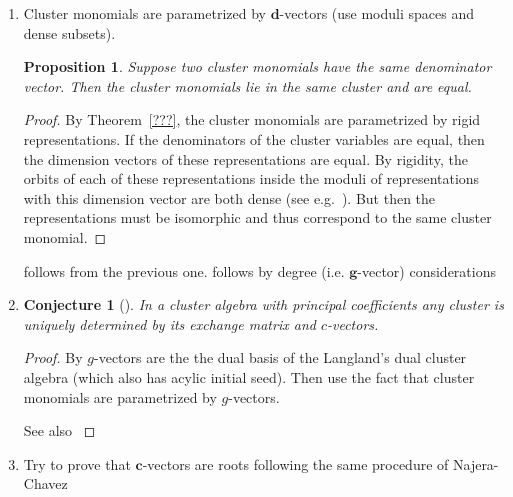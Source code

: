 \documentclass[12pt]{amsart}
\newtheorem{conjecture}[theorem]{Conjecture}
\newtheorem{proposition}[theorem]{Proposition}
\newcommand{\bfc}{\mathbf{c}}
\newcommand{\bfd}{\mathbf{d}}
\newcommand{\bfg}{\mathbf{g}}
\begin{document}
\begin{enumerate}
    \item
      Cluster monomials are parametrized by $\bfd$-vectors \cite[Conjecture 7.6]{fomin-zelevinsky4} (use moduli spaces and dense subsets).
      \begin{proposition}
        Suppose two cluster monomials have the same denominator vector.  Then the cluster monomials lie in the same cluster and are equal.
      \end{proposition}
      \begin{proof}
        By Theorem~\ref{???}, the cluster monomials are parametrized by rigid representations.
        If the denominators of the cluster variables are equal, then the dimension vectors of these representations are equal.
        By rigidity, the orbits of each of these representations inside the moduli of representations with this dimension vector are both dense (see e.g.\ \cite[Corollary 2.2.5]{brion}).
        But then the representations must be isomorphic and thus correspond to the same cluster monomial.
      \end{proof}
      \cite[Conjecture 7.10]{fomin-zelevinsky4} follows from the previous one.
      \cite[Conjecture 7.2]{fomin-zelevinsky4} follows by degree (i.e. $\bfg$-vector) considerations

    \item
      
      \begin{conjecture}[{\cite[Conjecture 4.7]{fomin-zelevinsky4}}]
        In a cluster algebra with principal coefficients any cluster is uniquely determined by its exchange matrix and $c$-vectors.
      \end{conjecture}
      \begin{proof}
        By \cite{NZ12} $g$-vectors are the the dual basis of the Langland's dual cluster algebra (which also has acylic initial seed). 
        Then use the fact that cluster monomials are parametrized by $g$-vectors.
        
        See also \cite[Conjectures 3.11 and 3.12]{reading-speyer}
      \end{proof}

    \item
      Try to prove that $\bfc$-vectors are roots following the same procedure of Najera-Chavez
  \end{enumerate}




\end{document}
